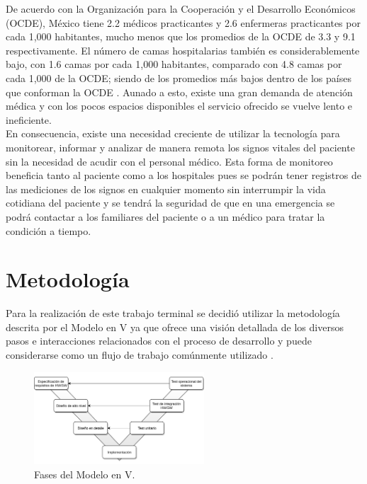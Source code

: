 \documentclass[journal]{IEEEtran}
\begin{document}
De acuerdo con la Organización para la Cooperación y el Desarrollo Económicos (OCDE), México tiene 2.2 médicos practicantes y 2.6 enfermeras practicantes por cada 1,000 habitantes, mucho menos que los promedios de la OCDE de 3.3 y 9.1 respectivamente. El número de camas hospitalarias también es considerablemente bajo, con 1.6 camas por cada 1,000 habitantes, comparado con 4.8 camas por cada 1,000 de la OCDE; siendo de los promedios más bajos dentro de los países que conforman la OCDE \cite{ocde2016}. Aunado a esto, existe una gran demanda de atención médica y con los pocos espacios disponibles el servicio ofrecido se vuelve lento e ineficiente. \\

En consecuencia, existe una necesidad creciente de utilizar la tecnología para monitorear, informar y analizar de manera remota los signos vitales del paciente sin la necesidad de acudir con el personal médico. Esta forma de monitoreo beneficia tanto al paciente como a los hospitales pues se podrán tener registros de las mediciones de los signos en cualquier momento sin interrumpir la vida cotidiana del paciente y se tendrá la seguridad de que en una emergencia se podrá contactar a los familiares del paciente o a un médico para tratar la condición a tiempo.

\section{Metodología}

Para la realización de este trabajo terminal se decidió utilizar la metodología descrita por el Modelo en V ya que ofrece una visión detallada de los diversos pasos e interacciones relacionados con el proceso de desarrollo y puede considerarse como un flujo de trabajo comúnmente utilizado \cite{perez2006V}. \\

\begin{figure}[htbp!]
	\centering
	\includegraphics[width=2.5in]{imagenes/metodologiaV.png}
	\caption{Fases del Modelo en V.}
	\label{fig:IntroduccionMetodologia}
\end{figure}
\end{document}
